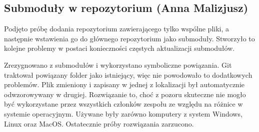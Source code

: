 \documentclass[10pt,twoside,a4paper]{report}
\begin{document}
\subsection{Submoduły w repozytorium (Anna Malizjusz)}
\par Podjęto próbę dodania repozytorium zawierającego tylko wspólne pliki, a następnie wstawienia go do głównego repozytorium jako submoduły. Stworzyło to kolejne problemy w postaci konieczności częstych aktualizacji submodułów.
\par Zrezygnowano z submodułów i wykorzystano symboliczne powiązania.
Git traktował powiązany folder jako istniejący, więc nie powodowało to dodatkowych problemów. Plik zmieniony i zapisany w jednej z lokalizacji był automatycznie odwzorowywany w drugiej. Rozwiązanie to, choć z pozoru skuteczne nie mogło być wykorzystane przez wszystkich członków zespołu ze względu na różnice w systemie operacyjnym. Używane były zarówno komputery z system Windows, Linux oraz MacOS. Ostatecznie próby rozwiązania zarzucono.
\end{document}
